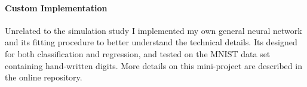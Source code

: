 \paragraph{Custom Implementation}

Unrelated to the simulation study I implemented my own general neural network and its
fitting procedure to better understand the technical details. Its designed for both
classification and regression, and tested on the MNIST data set containing hand-written
digits. More details on this mini-project are described in the online repository.
